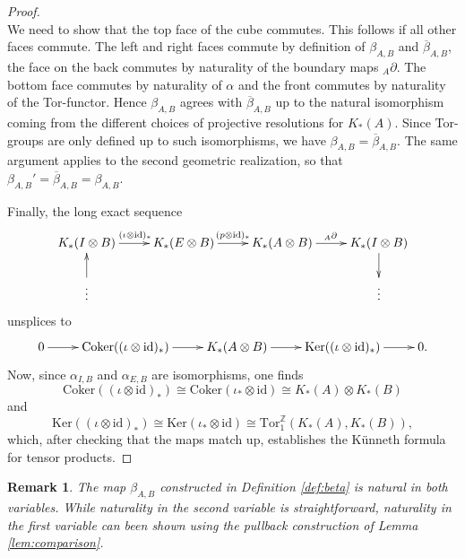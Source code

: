 \documentclass[a4paper,10pt]{amsart}
\newcommand{\Star}{{}^\ast}
\newcounter{theorem}
\newtheorem{remark}[theorem]{Remark}
\numberwithin{equation}{section}
\numberwithin{theorem}{section}
\newcommand{\Z}{\mathbb{Z}}
\newcommand{\Tor}{\mathrm{Tor}_1^{\Z}}
\newcommand{\id}{\mathrm{id}}
\newcommand{\DE}[1]{}
\begin{document}
\begin{proof}
\[{{		}
	}
\]
We need to show that the top face of the cube commutes.  This follows if all other faces commute. The left and right faces commute by definition of $\beta_{A,B}$ and $\overline \beta_{A,B}$, the face on the back commutes by naturality of the boundary maps ${}_A \partial$. The bottom face commutes by naturality of $\alpha$ and the front commutes by naturality of the Tor-functor. Hence $\beta_{A,B}$ agrees with $\overline{\beta}_{A,B}$ up to the natural isomorphism coming from the different choices of projective resolutions for $K_*(A)$. 
Since Tor-groups are only defined up to such isomorphisms, we have  $\beta_{A,B}=\overline{\beta}_{A,B}$.
The same argument applies to the second geometric realization, so that  $\beta_{A,B}'=\overline{\beta}_{A,B}=\beta_{A,B}$.

Finally, the long exact sequence
\[
	\xymatrix{
		  K_*(I\otimes B) \ar[r]^{(\iota\otimes\id)_*} & K_*(E\otimes B) \ar[r]^{(p\otimes\id)_*} & K_*(A\otimes B) \ar[r]^{{}_A\partial} &  K_*(I\otimes B) \ar[d] \\ 
		\vdots \ar[u] & & & \vdots
	}
\]
unsplices to
\[
	\xymatrix{
		0 \ar[r] & \mathrm{Coker}((\iota\otimes\id)_*) \ar[r] & K_*(A\otimes B) \ar[r] &  \mathrm{Ker}((\iota\otimes\id)_*) \ar[r] & 0.
	}
\]
Now, since $\alpha_{I,B}$ and $\alpha_{E,B}$ are isomorphisms, one finds
\[
	 \mathrm{Coker}((\iota\otimes\id)_*) \cong \mathrm{Coker}(\iota_*\otimes\id) \cong K_*(A)\otimes K_*(B)
\]
and
\[
	\mathrm{Ker}((\iota\otimes\id)_*) \cong \mathrm{Ker}(\iota_*\otimes\id) \cong \Tor(K_*(A),K_*(B)),
\]
which, after checking that the maps match up, establishes the K\"unneth formula for tensor products.
\end{proof}

\begin{remark}
\label{rem:natural}
The map $\beta_{A,B}$ constructed in Definition \ref{def:beta} is natural in both variables.
While naturality in the second variable is straightforward, naturality in the first variable can been shown using the pullback construction of Lemma \ref{lem:comparison}. 

\DE{we sketch the proof in the first variable here: given a $\Star$-homomorphism $\varphi\colon A\to A'$, one uses the pullback construction of Lemma \ref{lem:comparison} together with $\beta_{A,B}=\overline{\beta}_{A,B}$ (by \ref{prop:kunnethformula}) to see that
\[
	\begin{array}{rl}
		Tor(\varphi)\circ\beta_{A,B} &  = Tor(\varphi)\circ\overline{\beta}_{A,B} \\
		& =(q'_*\otimes\id)\circ\overline{\beta}_{A,B} \\
		& =(q'_*\otimes\id)\circ\alpha^{-1}_{\overline{I},B}\circ {}_A\partial \\
		& =\alpha^{-1}_{I',B}\circ(q'_*\otimes\id)\circ {}_A\partial \\
		& =\alpha^{-1}_{I',B}\circ {}_A\partial \circ (\varphi\otimes\id)_* \\
		& = \beta'_{A,B} \circ(\varphi\otimes\id)_* .
	\end{array}
\]
}	
\end{remark}
\end{document}

